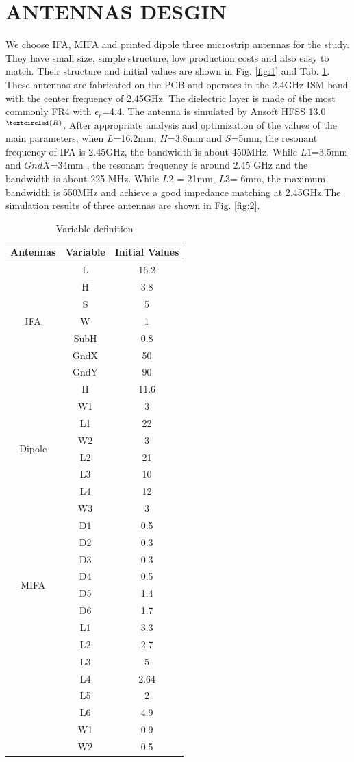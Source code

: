 \documentclass[journal]{IEEEtran}
\begin{document}
\section{ANTENNAS DESGIN}
We choose IFA, MIFA and printed dipole three microstrip antennas for the study. They have small size, simple structure, low
production costs and also easy to match. Their structure and initial values are shown in Fig. \ref{fig:1} and Tab. \ref{tab:1}.
These antennas are fabricated on the PCB and operates in the 2.4GHz ISM band with the center frequency of 2.45GHz. The
dielectric layer is made of the most commonly FR4 with $\epsilon_{r}$=4.4\cite{15}. The antenna is simulated by Ansoft HFSS
13.0$^{\textcircled{R}}$. After appropriate analysis and optimization of the values of the main parameters, when
$L$=16.2mm, $H$=3.8mm and $S$=5mm, the resonant frequency of IFA is 2.45GHz, the bandwidth is about
450MHz. While $L1$=3.5mm and $GndX$=34mm \cite{16}, the resonant frequency is around 2.45 GHz and the
bandwidth is about 225 MHz. While $L2$ = 21mm, $L3$= 6mm, the maximum bandwidth is 550MHz and achieve a good
impedance matching at 2.45GHz.The simulation results of three antennas are shown in Fig. \ref{fig:2}.

\begin{table}[!ht]
\centering
\begin{tabular}{|c|c|c|}
\hline
Antennas&Variable&Initial Values\\
\hline
\multirow{7}{*}{IFA}&L&16.2\\
&H&3.8\\
&S&5\\
&W&1\\
&SubH&0.8\\
&GndX&50\\
&GndY&90\\
\hline
\multirow{8}{*}{Dipole}&H&11.6\\
&W1&3\\
&L1&22\\
&W2&3\\
&L2&21\\
&L3&10\\
&L4&12\\
&W3&3\\
\hline
\multirow{8}{*}{MIFA}&D1&0.5\\
&D2&0.3\\
&D3&0.3\\
&D4&0.5\\
&D5&1.4\\
&D6&1.7\\
&L1&3.3\\
&L2&2.7\\
&L3&5\\
&L4&2.64\\
&L5&2\\
&L6&4.9\\
&W1&0.9\\
&W2&0.5\\
\hline
\end{tabular}
\caption{Variable definition}
\label{tab:1}
\end{table}
\end{document}
